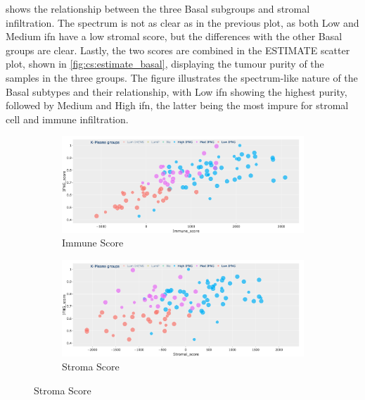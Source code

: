  shows the relationship between the three Basal subgroups and stromal infiltration. The spectrum is not as clear as in the previous plot, as both Low and Medium \acrshort{ifn} have a low stromal score, but the differences with the other Basal groups are clear. Lastly, the two scores are combined in the ESTIMATE scatter plot, shown in \cref{fig:cs:estimate_basal}, displaying the tumour purity of the samples in the three groups. The figure illustrates the spectrum-like nature of the Basal subtypes and their relationship, with Low \acrshort{ifn} showing the highest purity, followed by Medium and High \acrshort{ifn}, the latter being the most impure for stromal cell and immune infiltration. 


\begin{figure}[H]
    \captionsetup{font=small} 
    \centering
    \begin{subfigure}[!t]{0.89\textwidth}
        \includegraphics[width=\textwidth,keepaspectratio]{Sections/ClusteringAnalysis/Resources/discussion/Immune_spectrum.png}    
        \caption{Immune Score}
        \label{fig:cs:immune_basal}
    \end{subfigure}
    \centering
    \begin{subfigure}[!t]{0.89\textwidth}
        \includegraphics[width=\textwidth,keepaspectratio]{Sections/ClusteringAnalysis/Resources/discussion/Stroma_spectrum.png}
        \caption{Stroma Score}
        \label{fig:cs:stroma_basal}
    \end{subfigure} 

\end{figure}
